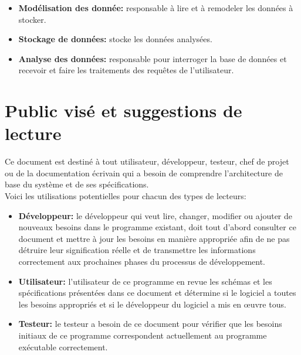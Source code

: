 \documentclass{scrreprt}
\begin{document}
\begin{itemize}
  \item \textbf{Modélisation des donnée:} \- responsable à lire et à remodeler les données à stocker.
  \item \textbf{Stockage de données:} \- stocke les données analysées.
  \item \textbf{Analyse des données:} \- responsable pour interroger la base de données et recevoir et faire les traitements des requêtes de l'utilisateur.

\end{itemize}


 \section{Public visé et suggestions de lecture}

Ce document est destiné à tout utilisateur, développeur, testeur, chef de projet ou de la documentation écrivain qui a besoin de comprendre l'architecture de base du système et de ses spécifications.\\
Voici les utilisations potentielles pour chacun des types de lecteurs:\\
\begin{itemize}

\item \textbf{Développeur: }le développeur qui veut lire, changer, modifier ou ajouter de nouveaux besoins dans le programme existant, doit tout d'abord consulter ce document et mettre à jour les besoins en manière appropriée afin de ne pas détruire leur signification réelle et de transmettre les informations correctement aux prochaines phases du processus de développement.\\

\item \textbf{Utilisateur: }l'utilisateur de ce programme en revue les schémas et les spécifications présentées dans ce document et détermine si le logiciel a toutes les besoins appropriés et si le développeur du logiciel a mis en œuvre tous.\\

\item \textbf{Testeur: }le testeur a besoin de ce document pour vérifier que les besoins initiaux de ce programme correspondent actuellement  au programme exécutable correctement.\\
\end{itemize}
\end{document}

